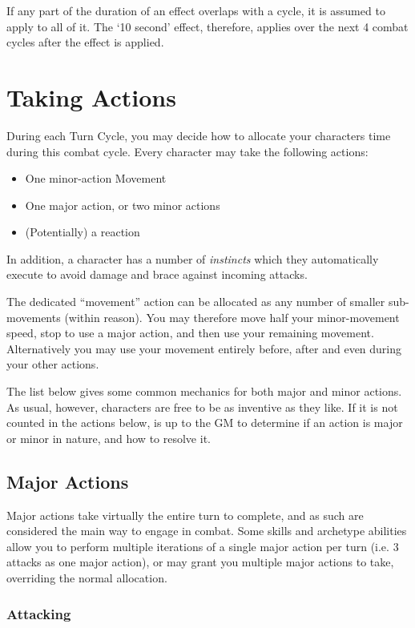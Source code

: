 If any part of the duration of an effect overlaps with a cycle, it is assumed to apply to all of it. The `10 second' effect, therefore, applies over the next 4 combat cycles after the effect is applied. 


 \section{Taking Actions} \label{S:CombatActions}
 
 During each Turn Cycle, you may decide how to allocate your character\apos{}s time during this combat cycle. Every character may take the following actions: 
 
 \begin{itemize}
	\item One minor-action Movement
	\item One major action, or two minor actions
	\item (Potentially) a reaction
 \end{itemize}
 
 In addition, a character has a number of {\it instincts} which they automatically execute to avoid damage and brace against incoming attacks. 
 
 The dedicated ``movement'' action can be allocated as any number of smaller sub-movements (within reason). You may therefore move half your minor-movement speed, stop to use a major action, and then use your remaining movement. Alternatively you may use your movement entirely before, after and even during your other actions.  
 
 The list below gives some common mechanics for both major and minor actions. As usual, however, characters are free to be as inventive as they like. If it is not counted in the actions below, is up to the GM to determine if an action is major or minor in nature, and how to resolve it. 
 
 \subsection{Major Actions}
 
 Major actions take virtually the entire turn to complete, and as such are considered the main way to engage in combat. Some skills and archetype abilities allow you to perform multiple iterations of a single major action per turn (i.e. 3 attacks as one major action), or may grant you multiple major actions to take, overriding the normal allocation. 
 
 \subsubsection{Attacking}
 
